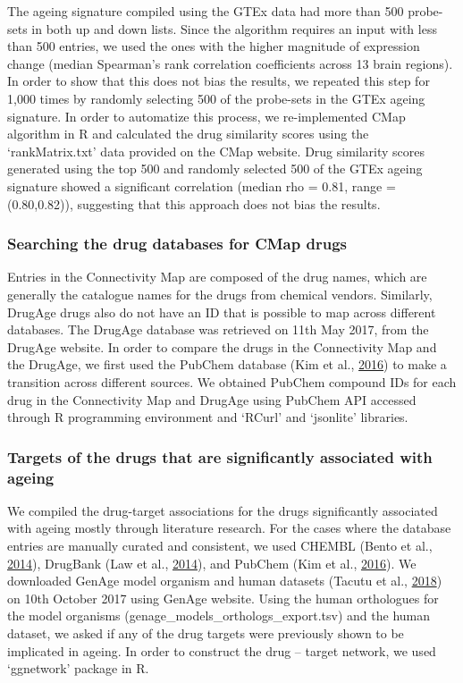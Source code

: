 \documentclass[12pt,twoside]{unicam}
\begin{document}
The ageing signature compiled using the GTEx data had more than 500 probe-sets in both up and down lists. Since the algorithm requires an input with less than 500 entries, we used the ones with the higher magnitude of expression change (median Spearman's rank correlation coefficients across 13 brain regions). In order to show that this does not bias the results, we repeated this step for 1,000 times by randomly selecting 500 of the probe-sets in the GTEx ageing signature. In order to automatize this process, we re-implemented CMap algorithm in R and calculated the drug similarity scores using the `rankMatrix.txt' data provided on the CMap website. Drug similarity scores generated using the top 500 and randomly selected 500 of the GTEx ageing signature showed a significant correlation (median rho = 0.81, range = (0.80,0.82)), suggesting that this approach does not bias the results.

\hypertarget{searching-the-drug-databases-for-cmap-drugs}{%
\subsubsection{Searching the drug databases for CMap drugs}\label{searching-the-drug-databases-for-cmap-drugs}}

Entries in the Connectivity Map are composed of the drug names, which are generally the catalogue names for the drugs from chemical vendors. Similarly, DrugAge drugs also do not have an ID that is possible to map across different databases. The DrugAge database was retrieved on 11th May 2017, from the DrugAge website. In order to compare the drugs in the Connectivity Map and the DrugAge, we first used the PubChem database (Kim et al., \protect\hyperlink{ref-Kim2016}{2016}) to make a transition across different sources. We obtained PubChem compound IDs for each drug in the Connectivity Map and DrugAge using PubChem API accessed through R programming environment and `RCurl' and `jsonlite' libraries.

\hypertarget{targets-of-the-drugs-that-are-significantly-associated-with-ageing}{%
\subsubsection{Targets of the drugs that are significantly associated with ageing}\label{targets-of-the-drugs-that-are-significantly-associated-with-ageing}}

We compiled the drug-target associations for the drugs significantly associated with ageing mostly through literature research. For the cases where the database entries are manually curated and consistent, we used CHEMBL (Bento et al., \protect\hyperlink{ref-Bento2014}{2014}), DrugBank (Law et al., \protect\hyperlink{ref-Law2014}{2014}), and PubChem (Kim et al., \protect\hyperlink{ref-Kim2016}{2016}). We downloaded GenAge model organism and human datasets (Tacutu et al., \protect\hyperlink{ref-Tacutu2018}{2018}) on 10th October 2017 using GenAge website. Using the human orthologues for the model organisms (genage\_models\_orthologs\_export.tsv) and the human dataset, we asked if any of the drug targets were previously shown to be implicated in ageing. In order to construct the drug -- target network, we used `ggnetwork' package in R.
\end{document}
